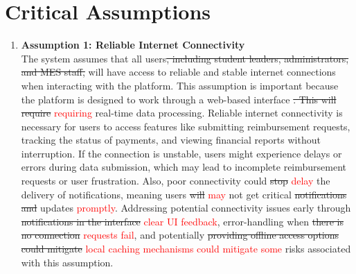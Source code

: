 \documentclass{article}
\begin{document}
\section{Critical Assumptions}
\begin{enumerate}
    \item \textbf{Assumption 1: Reliable Internet Connectivity} \\
    The system assumes that all users\sout{, including student leaders, administrators, and MES staff,} will have access to reliable and stable internet connections when interacting with the platform. This assumption is important because the platform is designed to work through a web-based interface \sout{. This will require} \textcolor{red}{requiring} real-time data processing. Reliable internet connectivity is necessary for users to access features like submitting reimbursement requests, tracking the status of payments, and viewing financial reports without interruption. If the connection is unstable, users might experience delays or errors during data submission, which may lead to incomplete reimbursement requests or user frustration. Also, poor connectivity could \sout{stop} \textcolor{red}{delay} the delivery of notifications, meaning users \sout{will} \textcolor{red}{may} not get critical \sout{notifications and} updates \textcolor{red}{promptly}. Addressing potential connectivity issues early through \sout{notifications in the interface} \textcolor{red}{clear UI feedback}, error-handling when \sout{there is no connection} \textcolor{red}{requests fail}, and potentially \sout{providing offline access options could mitigate} \textcolor{red}{local caching mechanisms could mitigate some} risks associated with this assumption.


\end{enumerate}
\end{document}
